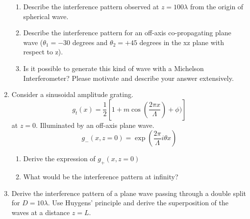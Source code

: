 \documentclass[main.tex]{subfiles}
\begin{document}
\begin{enumerate}
\begin{enumerate}
\item{Describe the interference pattern observed at $z=100\lambda$ from the origin of spherical wave.}

\item{Describe the interference pattern for an off-axis co-propagating plane wave ($\theta_1 = -30$ degrees and $\theta_2 = +45$ degrees in the xz plane with respect to z).}

\item{Is it possible to generate this kind of wave with a Michelson Interferometer? Please motivate and describe your answer extensively.}

\end{enumerate}
\item{Consider a sinusoidal amplitude grating.}
$$g_t(x)=\frac{1}{2}\left[ 1+m\cos(\frac{2\pi x}{\Lambda}) + \phi) \right]$$
at $z=0$. Illuminated by an off-axis plane wave.
$$g_{-}(x,z=0)=\exp(\frac{2\pi}{\Lambda}i \theta x)$$
\begin{enumerate}

\item{Derive the expression of $g_{\text{+}}(x,z=0)$}

\item{What would be the interference pattern at infinity?}
\end{enumerate}
\item{Derive the interference pattern of a plane wave passing through a double split for $D=10\lambda$. Use Huygens' principle and derive the superposition of the waves at a distance $z=L$.}\\

\end{enumerate}
\end{document}
